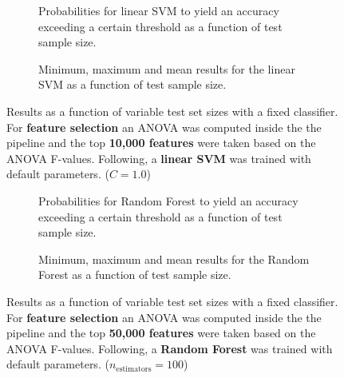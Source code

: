 \begin{figure}
    \captionsetup[subfigure]{justification=justified,singlelinecheck=false}
    \begin{subfigure}[t]{0.61\textwidth}
        
        \caption{Probabilities for linear SVM to yield an accuracy exceeding a certain threshold as a function of test sample size.}
    \end{subfigure}
    \hspace{3.0mm}
    \begin{subfigure}[t]{0.34\textwidth}
        
        \caption{Minimum, maximum and mean results for the linear SVM as a function of test sample size.}
    \end{subfigure}
    \caption[Effects of varying test sample size. Linear SVM; Preprocessing: ANOVA feature selection ($k_\text{best} = \num{10000}$)]{Results as a function of variable test set sizes with a fixed classifier. For \textbf{feature selection} an ANOVA was computed inside the the pipeline and the top \textbf{10,000 features} were taken based on the ANOVA F-values. Following, a \textbf{{linear SVM}} was trained with default parameters. ($C=\num{1.0}$)}
    \label{fig:no_PCA_10000_best_selected_LinearSVC}
\end{figure}

\begin{figure}
    \captionsetup[subfigure]{justification=justified,singlelinecheck=false}
    \begin{subfigure}[t]{0.61\textwidth}
        
        \caption{Probabilities for Random Forest to yield an accuracy exceeding a certain threshold as a function of test sample size.}
    \end{subfigure}
    \hspace{3.0mm}
    \begin{subfigure}[t]{0.34\textwidth}
        
        \caption{Minimum, maximum and mean results for the Random Forest as a function of test sample size.}
    \end{subfigure}
    \caption[Effects of varying test sample size. Random Forest; Preprocessing: ANOVA feature selection ($k_\text{best} = \num{50000}$)]{Results as a function of variable test set sizes with a fixed classifier. For \textbf{feature selection} an ANOVA was computed inside the the pipeline and the top \textbf{50,000 features} were taken based on the ANOVA F-values. Following, a \textbf{{Random Forest}} was trained with default parameters. ($n_\text{estimators}=\num{100}$)}
    \label{fig:no_PCA_50000_best_selected_RandomForest}
\end{figure}

